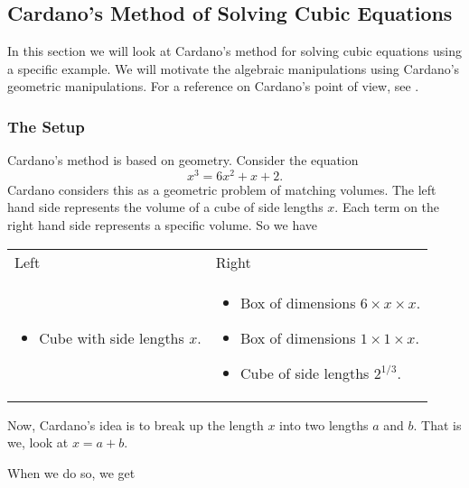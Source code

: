 \subsection{Cardano's Method of Solving Cubic Equations}

In this section we will look at Cardano's method for solving cubic equations using a specific example. We
will motivate the algebraic manipulations using Cardano's geometric manipulations. For a reference on Cardano's
point of view, see \cite{cardano}. 

\subsubsection*{The Setup}

\newcommand{\boxDim}[3]{{#1} \times {#2} \times {#3}}
Cardano's method is based on geometry. Consider the equation
\begin{equation}
x^3 = 6x^2 + x + 2.
\end{equation}
Cardano considers this as a geometric problem of matching volumes. The left hand side represents
the volume of a cube of side lengths \(x\). Each term on the right hand side represents a specific volume.
So we have

\begin{tabular}{p{} | p{}}
    Left & Right \\
    \begin{itemize}
    \item Cube with side lengths \(x\).
    \end{itemize} 
    
    &
    \begin{itemize}
    \item Box of dimensions \(\boxDim{6}{x}{x}\). 
    \item Box of dimensions \(\boxDim{1}{1}{x}\).
    \item Cube of side lengths \(2^{1/3}\). 
    \end{itemize} 
\end{tabular}

Now, Cardano's idea is to break up the length \(x\) into two lengths \(a\) and \(b\). That is we, look at
\(x = a + b\).

When we do so, we get


